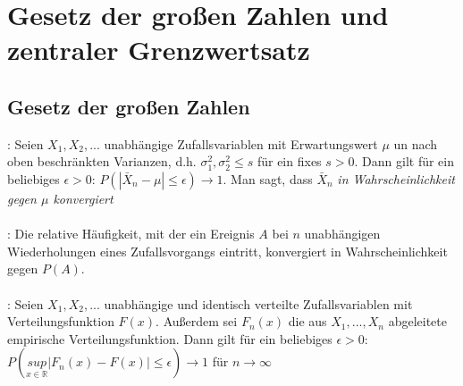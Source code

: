 \section{Gesetz der großen Zahlen und zentraler Grenzwertsatz}
\subsection{Gesetz der großen Zahlen}
: Seien $X_1, X_2, ...$ unabhängige Zufallsvariablen mit Erwartungswert $\mu$ un nach oben beschränkten Varianzen, d.h. $\sigma_1^2, \sigma_2^2 \le s$ für ein fixes $s > 0$. Dann gilt für ein beliebiges $\epsilon > 0$: $P(|\bar{X}_n - \mu| \le \epsilon) \rightarrow 1$. Man sagt, dass $\bar{X}_n$ \emph{in Wahrscheinlichkeit gegen $\mu$ konvergiert}\\\\
: Die relative Häufigkeit, mit der ein Ereignis $A$ bei $n$ unabhängigen Wiederholungen eines Zufallsvorgangs eintritt, konvergiert in Wahrscheinlichkeit gegen $P(A)$. \\\\
: Seien $X_1, X_2, ...$ unabhängige und identisch verteilte Zufallsvariablen mit Verteilungsfunktion $F(x)$. Außerdem sei $F_n(x)$ die aus $X_1, ..., X_n$ abgeleitete empirische Verteilungsfunktion. Dann gilt für ein beliebiges $\epsilon > 0$: $P({\underset{x\in \mathds{R}}{sup} | F_n(x) - F(x)| \le \epsilon}) \rightarrow 1$ für $n \rightarrow \infty$
